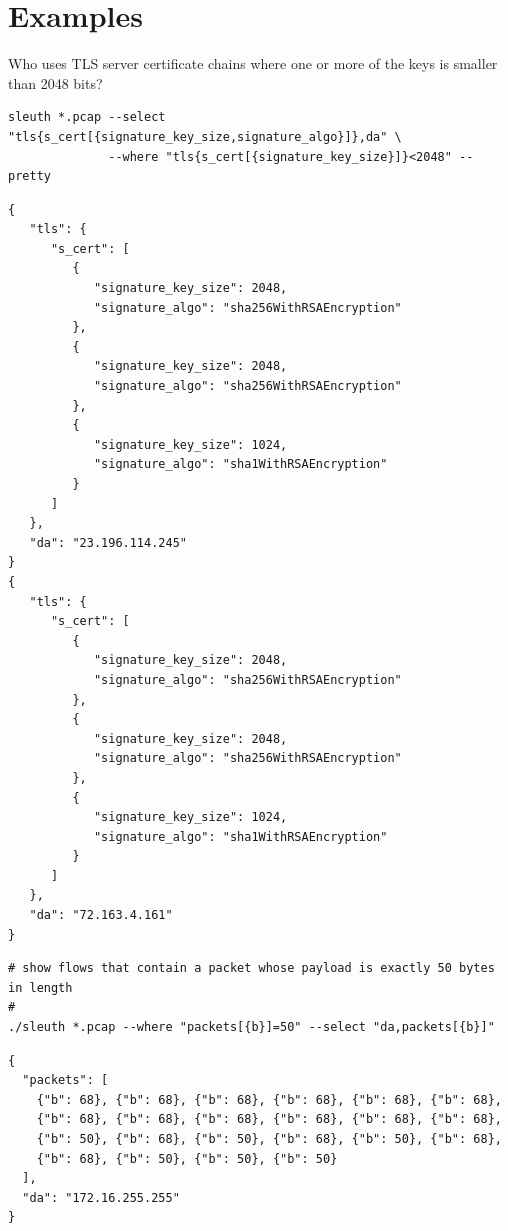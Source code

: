 \documentclass{book}
\begin{document}
\chapter{Examples}

Who uses TLS server certificate chains where one or more of the keys is smaller than 2048 bits?
\begin{mdframed}[style=cli]
\begin{verbatim}
sleuth *.pcap --select "tls{s_cert[{signature_key_size,signature_algo}]},da" \
              --where "tls{s_cert[{signature_key_size}]}<2048" --pretty 
\end{verbatim}
\begin{verbatim}
{
   "tls": {
      "s_cert": [
         {
            "signature_key_size": 2048, 
            "signature_algo": "sha256WithRSAEncryption"
         }, 
         {
            "signature_key_size": 2048, 
            "signature_algo": "sha256WithRSAEncryption"
         }, 
         {
            "signature_key_size": 1024, 
            "signature_algo": "sha1WithRSAEncryption"
         }
      ]
   }, 
   "da": "23.196.114.245"
}
{
   "tls": {
      "s_cert": [
         {
            "signature_key_size": 2048, 
            "signature_algo": "sha256WithRSAEncryption"
         }, 
         {
            "signature_key_size": 2048, 
            "signature_algo": "sha256WithRSAEncryption"
         }, 
         {
            "signature_key_size": 1024, 
            "signature_algo": "sha1WithRSAEncryption"
         }
      ]
   }, 
   "da": "72.163.4.161"
}
\end{verbatim}
\end{mdframed}

\begin{mdframed}[style=cli]
\begin{verbatim}
# show flows that contain a packet whose payload is exactly 50 bytes in length
#
./sleuth *.pcap --where "packets[{b}]=50" --select "da,packets[{b}]" 
\end{verbatim}
\begin{verbatim}
{
  "packets": [
    {"b": 68}, {"b": 68}, {"b": 68}, {"b": 68}, {"b": 68}, {"b": 68},
    {"b": 68}, {"b": 68}, {"b": 68}, {"b": 68}, {"b": 68}, {"b": 68},
    {"b": 50}, {"b": 68}, {"b": 50}, {"b": 68}, {"b": 50}, {"b": 68},
    {"b": 68}, {"b": 50}, {"b": 50}, {"b": 50}
  ],
  "da": "172.16.255.255"
}
\end{verbatim}
\end{mdframed}
\end{document}
